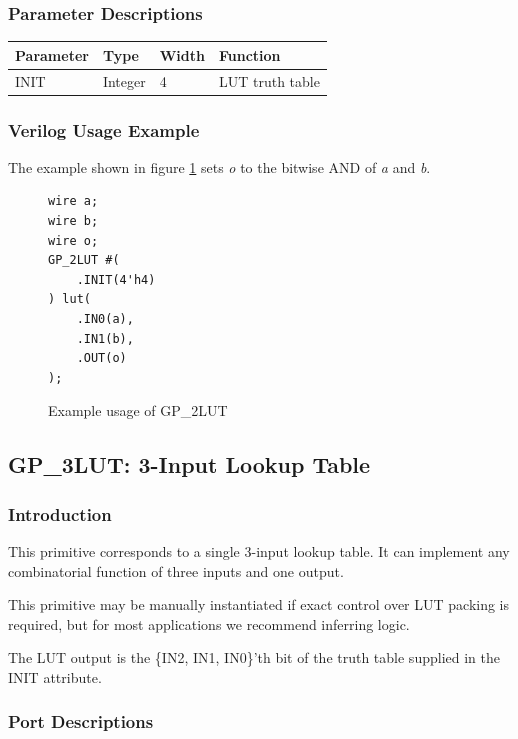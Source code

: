 \documentclass[11pt]{article}
\begin{document}
\subsubsection{Parameter Descriptions}

\begin{tabularx}{4in}{|l|l|l|X|}
\hline
{\bfseries Parameter} & {\bfseries Type} & {\bfseries Width} & {\bfseries Function} \\
\hline
INIT & Integer & 4 & LUT truth table \\
\hline
\end{tabularx}

\subsubsection{Verilog Usage Example}

The example shown in figure \ref{gp-2LUT-example} sets \emph{o} to the bitwise AND of \emph{a} and \emph{b}.

\begin{figure}[h]
\begin{lstlisting}
wire a;
wire b;
wire o;
GP_2LUT #(
	.INIT(4'h4)
) lut(
	.IN0(a),
	.IN1(b),
	.OUT(o)
);
\end{lstlisting}
\caption{Example usage of GP\_2LUT}
\label{gp-2LUT-example}
\end{figure}


\pagebreak
\subsection{GP\_3LUT: 3-Input Lookup Table}

\subsubsection{Introduction}
This primitive corresponds to a single 3-input lookup table. It can implement any combinatorial function of three 
inputs and one output.

This primitive may be manually instantiated if exact control over LUT packing is required, but for most applications we 
recommend inferring logic.

The LUT output is the \{IN2, IN1, IN0\}'th bit of the truth table supplied in the INIT attribute.

\subsubsection{Port Descriptions}
\end{document}
